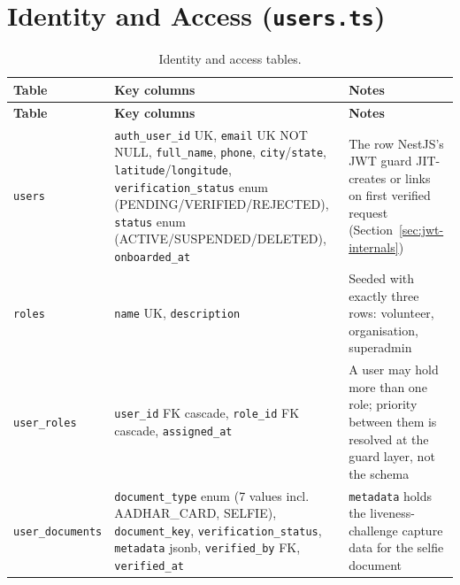 \begingroup
\footnotesize

\section{Identity and Access (\texttt{users.ts})}
\begin{longtable}{|>{\raggedright\arraybackslash}p{}|>{\raggedright\arraybackslash}p{}|>{\raggedright\arraybackslash}p{}|}
\caption{Identity and access tables.}\\\hline
\textbf{Table} & \textbf{Key columns} & \textbf{Notes}\\\hline
\endfirsthead\hline\textbf{Table} & \textbf{Key columns} & \textbf{Notes}\\\hline\endhead
\texttt{users} & \texttt{auth\_user\_id} UK, \texttt{email} UK NOT NULL, \texttt{full\_name}, \texttt{phone}, \texttt{city}/\allowbreak\texttt{state}, \texttt{latitude}/\allowbreak\texttt{longitude}, \texttt{verification\_status} enum (PENDING/\allowbreak VERIFIED/\allowbreak REJECTED), \texttt{status} enum (ACTIVE/\allowbreak SUSPENDED/\allowbreak DELETED), \texttt{onboarded\_at} & The row NestJS's JWT guard JIT-creates or links on first verified request (Section~\ref{sec:jwt-internals})\\\hline
\texttt{roles} & \texttt{name} UK, \texttt{description} & Seeded with exactly three rows: volunteer, organisation, superadmin\\\hline
\texttt{user\_roles} & \texttt{user\_id} FK cascade, \texttt{role\_id} FK cascade, \texttt{assigned\_at} & A user may hold more than one role; priority between them is resolved at the guard layer, not the schema\\\hline
\texttt{user\_\allowbreak documents} & \texttt{document\_type} enum (7 values incl. AADHAR\_CARD, SELFIE), \texttt{document\_key}, \texttt{verification\_status}, \texttt{metadata} jsonb, \texttt{verified\_by} FK, \texttt{verified\_at} & \texttt{metadata} holds the liveness-challenge capture data for the selfie document\\\hline
\end{longtable}

